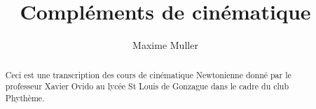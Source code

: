\documentclass[a4paper]{report}
\author{Maxime Muller}
\title{Compléments de cinématique}
\begin{document}
\maketitle

\begin{abstract}
    Ceci est une transcription des cours de cinématique Newtonienne donné par le professeur Xavier Ovido au lycée St Louis de Gonzague dans le cadre du club Phythème.
\end{abstract}

\newpage

\tableofcontents

\end{document}
